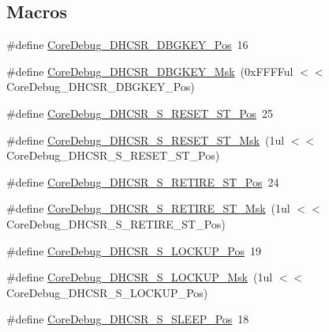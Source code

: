 \subsection*{Macros}
\begin{DoxyCompactItemize}
\item 
\#define \hyperlink{group___c_m_s_i_s___c_m3___core_debug_gac91280edd0ce932665cf75a23d11d842}{Core\-Debug\-\_\-\-D\-H\-C\-S\-R\-\_\-\-D\-B\-G\-K\-E\-Y\-\_\-\-Pos}~16
\item 
\#define \hyperlink{group___c_m_s_i_s___c_m3___core_debug_ga1ce997cee15edaafe4aed77751816ffc}{Core\-Debug\-\_\-\-D\-H\-C\-S\-R\-\_\-\-D\-B\-G\-K\-E\-Y\-\_\-\-Msk}~(0x\-F\-F\-F\-Ful $<$$<$ Core\-Debug\-\_\-\-D\-H\-C\-S\-R\-\_\-\-D\-B\-G\-K\-E\-Y\-\_\-\-Pos)
\item 
\#define \hyperlink{group___c_m_s_i_s___c_m3___core_debug_ga6f934c5427ea057394268e541fa97753}{Core\-Debug\-\_\-\-D\-H\-C\-S\-R\-\_\-\-S\-\_\-\-R\-E\-S\-E\-T\-\_\-\-S\-T\-\_\-\-Pos}~25
\item 
\#define \hyperlink{group___c_m_s_i_s___c_m3___core_debug_gac474394bcceb31a8e09566c90b3f8922}{Core\-Debug\-\_\-\-D\-H\-C\-S\-R\-\_\-\-S\-\_\-\-R\-E\-S\-E\-T\-\_\-\-S\-T\-\_\-\-Msk}~(1ul $<$$<$ Core\-Debug\-\_\-\-D\-H\-C\-S\-R\-\_\-\-S\-\_\-\-R\-E\-S\-E\-T\-\_\-\-S\-T\-\_\-\-Pos)
\item 
\#define \hyperlink{group___c_m_s_i_s___c_m3___core_debug_ga2328118f8b3574c871a53605eb17e730}{Core\-Debug\-\_\-\-D\-H\-C\-S\-R\-\_\-\-S\-\_\-\-R\-E\-T\-I\-R\-E\-\_\-\-S\-T\-\_\-\-Pos}~24
\item 
\#define \hyperlink{group___c_m_s_i_s___c_m3___core_debug_ga89dceb5325f6bcb36a0473d65fbfcfa6}{Core\-Debug\-\_\-\-D\-H\-C\-S\-R\-\_\-\-S\-\_\-\-R\-E\-T\-I\-R\-E\-\_\-\-S\-T\-\_\-\-Msk}~(1ul $<$$<$ Core\-Debug\-\_\-\-D\-H\-C\-S\-R\-\_\-\-S\-\_\-\-R\-E\-T\-I\-R\-E\-\_\-\-S\-T\-\_\-\-Pos)
\item 
\#define \hyperlink{group___c_m_s_i_s___c_m3___core_debug_ga2900dd56a988a4ed27ad664d5642807e}{Core\-Debug\-\_\-\-D\-H\-C\-S\-R\-\_\-\-S\-\_\-\-L\-O\-C\-K\-U\-P\-\_\-\-Pos}~19
\item 
\#define \hyperlink{group___c_m_s_i_s___c_m3___core_debug_ga7b67e4506d7f464ef5dafd6219739756}{Core\-Debug\-\_\-\-D\-H\-C\-S\-R\-\_\-\-S\-\_\-\-L\-O\-C\-K\-U\-P\-\_\-\-Msk}~(1ul $<$$<$ Core\-Debug\-\_\-\-D\-H\-C\-S\-R\-\_\-\-S\-\_\-\-L\-O\-C\-K\-U\-P\-\_\-\-Pos)
\item 
\#define \hyperlink{group___c_m_s_i_s___c_m3___core_debug_ga349ccea33accc705595624c2d334fbcb}{Core\-Debug\-\_\-\-D\-H\-C\-S\-R\-\_\-\-S\-\_\-\-S\-L\-E\-E\-P\-\_\-\-Pos}~18

\end{DoxyCompactItemize}
